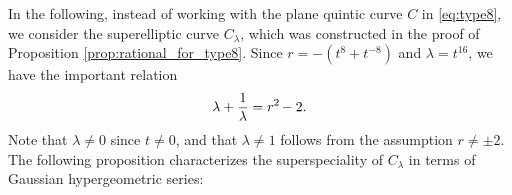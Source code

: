 \documentclass{article}
\theoremstyle{definition}
\begin{document}
In the following, instead of working with the plane quintic curve $C$ in \eqref{eq:type8}, we consider the superelliptic curve $C_\lambda$, which was constructed in the proof of Proposition \ref{prop:rational_for_type8}.
Since $r = -(t^8+t^{-8})$ and $\lambda = t^{16}$, we have the important relation\vspace{-0.8mm}
\begin{equation}\label{eq:lambda_for_type8}
    \lambda+\frac{1}{\lambda} = r^2\hspace{-0.3mm}-2.
\end{equation}
Note that $\lambda \neq 0$ since $t \neq 0$, and that $\lambda \neq 1$ follows from the assumption $r \neq \pm 2$.
The following proposition characterizes the superspeciality of $C_\lambda$ in terms of Gaussian hypergeometric series:\vspace{-1.3mm}
\end{document}
